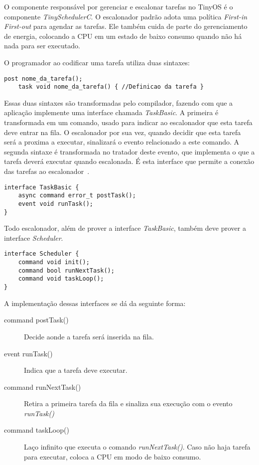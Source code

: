 O componente responsável por gerenciar e escalonar tarefas no TinyOS é o componente {\em TinySchedulerC}.
O escalonador padrão adota uma política {\em First-in First-out} para agendar as tarefas. Ele também
cuida de parte do gerenciamento de energia, colocando a CPU em um estado de baixo consumo quando
não há nada para ser executado.

O programador ao codificar uma tarefa utiliza duas sintaxes:
\begin{lstlisting}[frame=none]
    post nome_da_tarefa();
    task void nome_da_tarefa() { //Definicao da tarefa }
\end{lstlisting}
Essas duas sintaxes são transformadas pelo compilador, fazendo com que a aplicação implemente uma interface chamada \textit{TaskBasic}.
A primeira é transformada em um comando, usado para indicar ao escalonador que esta tarefa deve entrar na fila.
O escalonador por sua vez, quando decidir que esta tarefa será a proxima a executar, sinalizará o evento relacionado a
este comando.
A segunda sintaxe é transformada no tratador deste evento, que implementa o que a tarefa deverá executar quando
escalonada.
É esta interface que permite a conexão das tarefas ao escalonador~\cite{LevisGay/09}.
\begin{lstlisting}
interface TaskBasic {
    async command error_t postTask();
    event void runTask();
}
\end{lstlisting}

Todo escalonador, além de prover a interface \textit{TaskBasic}, também deve prover a interface \textit{Scheduler}.
\begin{lstlisting}
interface Scheduler {
    command void init();
    command bool runNextTask();
    command void taskLoop();
}
\end{lstlisting}
A implementação dessas interfaces se dá da seguinte forma:
\begin{description}
    \item[command postTask()] Decide aonde a tarefa será inserida na fila.
    \item[event runTask()] Indica que a tarefa deve executar.
    \item[command runNextTask()] Retira a primeira tarefa da fila e sinaliza sua execução com o evento
    \textit{runTask()}
    \item[command taskLoop()] Laço infinito que executa o comando \textit{runNextTask()}. Caso não haja tarefa para
    executar, coloca a CPU em modo de baixo consumo. 
\end{description}


